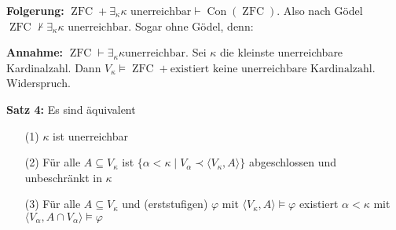 \documentclass[a4paper,fontsize=11pt]{scrartcl}
\newcommand{\ZFC}{\operatorname{ZFC}}
\newcommand{\Con}{\operatorname{Con}}
\begin{document}
{\bf Folgerung:} $\ZFC + \exists_\kappa \kappa\mbox{ unerreichbar
}\vdash \Con(\ZFC)$. Also nach Gödel
$\ZFC\not\vdash\exists_\kappa\kappa\mbox{ unerreichbar}$. Sogar ohne
Gödel, denn:

{\bf Annahme:} $\ZFC\vdash\exists_\kappa\kappa\mbox{
  unerreichbar}$. Sei $\kappa$ die kleinste unerreichbare
Kardinalzahl. Dann $V_\kappa\models\ZFC+\mbox{existiert keine
  unerreichbare Kardinalzahl}$. Widerspruch.




{\bf Satz 4:} Es sind äquivalent
\begin{itemize}
\item[(1)] $\kappa$ ist unerreichbar
\item[(2)] Für alle $A\subseteq V_{\kappa}$ ist $\{\alpha <\kappa \mid
  V_{\alpha} \prec \langle V_{\kappa}, A\rangle\}$ abgeschlossen und
  unbeschränkt in $\kappa$
\item[(3)] Für alle $A\subseteq V_{\kappa}$ und (erststufigen) $\varphi$
  mit $\langle V_{\kappa}, A\rangle\models \varphi$ existiert
  $\alpha<\kappa$ mit $\langle V_{\alpha}, A\cap V_{\alpha} \rangle
  \models \varphi$
\end{itemize}
\end{document}
